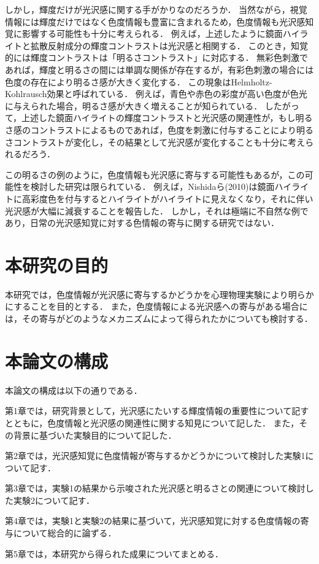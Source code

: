         しかし，輝度だけが光沢感に関する手がかりなのだろうか．
        当然ながら，視覚情報には輝度だけではなく色度情報も豊富に含まれるため，色度情報も光沢感知覚に影響する可能性も十分に考えられる．
        例えば，上述したように鏡面ハイライトと拡散反射成分の輝度コントラストは光沢感と相関する．
        このとき，知覚的には輝度コントラストは「明るさコントラスト」に対応する．
        無彩色刺激であれば，輝度と明るさの間には単調な関係が存在するが，有彩色刺激の場合には色度の存在により明るさ感が大きく変化する．
        この現象はHelmholtz-Kohlrausch効果と呼ばれている．\cite{h-k effect}
        例えば，青色や赤色の彩度が高い色度が色光に与えられた場合，明るさ感が大きく増えることが知られている．
        したがって，上述した鏡面ハイライトの輝度コントラストと光沢感の関連性が，もし明るさ感のコントラストによるものであれば，色度を刺激に付与することにより明るさコントラストが変化し，その結果として光沢感が変化することも十分に考えられるだろう．

        この明るさの例のように，色度情報も光沢感に寄与する可能性もあるが，この可能性を検討した研究は限られている．
        例えば，Nishidaら(2010)は鏡面ハイライトに高彩度色を付与するとハイライトがハイライトに見えなくなり，それに伴い光沢感が大幅に減衰することを報告した．\cite{Nishida}
        しかし，それは極端に不自然な例であり，日常の光沢感知覚に対する色情報の寄与に関する研究ではない．


    \section{本研究の目的}
        本研究では，色度情報が光沢感に寄与するかどうかを心理物理実験により明らかにすることを目的とする．
        また，色度情報による光沢感への寄与がある場合には，その寄与がどのようなメカニズムによって得られたかについても検討する．

    \section{本論文の構成}
        本論文の構成は以下の通りである．

        第1章では，研究背景として，光沢感にたいする輝度情報の重要性について記すとともに，色度情報と光沢感の関連性に関する知見について記した．
        また，その背景に基づいた実験目的について記した．

        第2章では，光沢感知覚に色度情報が寄与するかどうかについて検討した実験1について記す．

        第3章では，実験1の結果から示唆された光沢感と明るさとの関連について検討した実験2について記す．

        第4章では，実験1と実験2の結果に基づいて，光沢感知覚に対する色度情報の寄与について総合的に論ずる．

        第5章では，本研究から得られた成果についてまとめる．

    \newpage